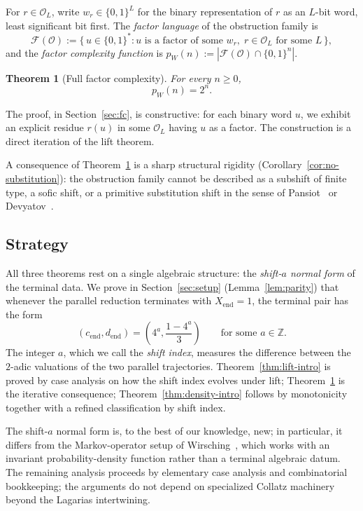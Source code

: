 \documentclass[11pt,reqno]{amsart}
\theoremstyle{plain}
\newtheorem{theorem}{Theorem}[section]
\theoremstyle{definition}
\theoremstyle{remark}
\newcommand{\Z}{\mathbb{Z}}
\newcommand{\Obs}{\mathcal{O}}
\newcommand{\Fac}{\mathcal{F}}
\newcommand{\Xend}{X_{\mathrm{end}}}
\newcommand{\cend}{c_{\mathrm{end}}}
\newcommand{\dend}{d_{\mathrm{end}}}
\begin{document}
For $r \in \Obs_L$, write $w_r \in \{0,1\}^L$ for the binary representation
of $r$ as an $L$-bit word, least significant bit first. The
\emph{factor language} of the obstruction family is
\[
\Fac(\Obs) := \{\, u \in \{0,1\}^* : u \text{ is a factor of some } w_r,\; r \in \Obs_L \text{ for some } L \,\},
\]
and the \emph{factor complexity function} is
$p_W(n) := |\Fac(\Obs) \cap \{0,1\}^n|$.

\begin{theorem}[Full factor complexity]
\label{thm:fc-intro}
For every $n \ge 0$,
\[
p_W(n) = 2^n.
\]
\end{theorem}

The proof, in Section~\ref{sec:fc}, is constructive: for each binary word
$u$, we exhibit an explicit residue $r(u)$ in some $\Obs_L$ having $u$ as a
factor. The construction is a direct iteration of the lift theorem.

A consequence of Theorem~\ref{thm:fc-intro} is a sharp structural rigidity
(Corollary~\ref{cor:no-substitution}): the obstruction family cannot be
described as a subshift of finite type, a sofic shift, or a primitive
substitution shift in the sense of Pansiot~\cite{Pansiot1984} or
Devyatov~\cite{Devyatov2015}.

\subsection{Strategy}

All three theorems rest on a single algebraic structure: the \emph{shift-$a$
normal form} of the terminal data. We prove in Section~\ref{sec:setup}
(Lemma~\ref{lem:parity}) that whenever the parallel reduction terminates
with $\Xend = 1$, the terminal pair has the form
\[
(\cend, \dend) = \left(4^a, \frac{1 - 4^a}{3}\right) \qquad \text{for some } a \in \Z.
\]
The integer $a$, which we call the \emph{shift index}, measures the
difference between the $2$-adic valuations of the two parallel trajectories.
Theorem~\ref{thm:lift-intro} is proved by case analysis on how the shift
index evolves under lift; Theorem~\ref{thm:fc-intro} is the iterative
consequence; Theorem~\ref{thm:density-intro} follows by monotonicity
together with a refined classification by shift index.

The shift-$a$ normal form is, to the best of our knowledge, new; in
particular, it differs from the Markov-operator setup of
Wirsching~\cite{Wirsching1998}, which works with an invariant
probability-density function rather than a terminal algebraic datum. The
remaining analysis proceeds by elementary case analysis and combinatorial
bookkeeping; the arguments do not depend on specialized Collatz machinery
beyond the Lagarias intertwining.
\end{document}

